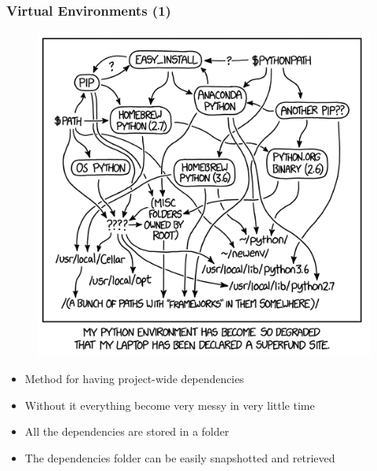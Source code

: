 \documentclass{beamer}
\begin{document}
\begin{frame}
    \frametitle{Virtual Environments (1)}
    \begin{figure}
        \includegraphics[scale=0.25]{imgs/xkcd.png}
    \end{figure}
    \begin{itemize}
        \item Method for having project-wide dependencies
        \item Without it everything become very messy in very little time
        \item All the dependencies are stored in a folder
        \item The dependencies folder can be easily snapshotted and retrieved
    \end{itemize}
\end{frame}
\end{document}
